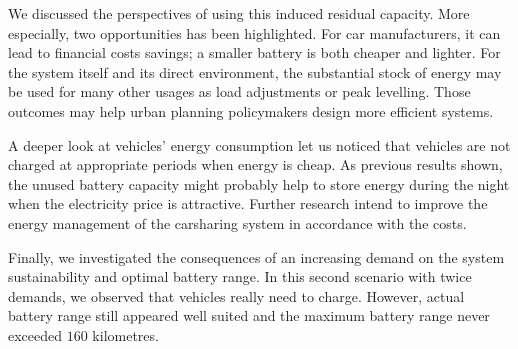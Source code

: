 \medskip
We discussed the perspectives of using this induced residual capacity.
More especially, two opportunities has been highlighted.
For car manufacturers, it can lead to financial costs savings; a smaller battery is both cheaper and lighter. %
For the system itself and its direct environment, the substantial stock of energy may be used for many other usages as load adjustments or peak levelling.
Those outcomes may help urban planning policymakers design more efficient systems.

\medskip
A deeper look at vehicles' energy consumption let us noticed that vehicles are not charged at appropriate periods when energy is cheap.
As previous results shown, the unused battery capacity might probably help to store energy during the night when the electricity price is attractive.
Further research intend to improve the energy management of the carsharing system in accordance with the costs.

\medskip
Finally, we investigated the consequences of an increasing demand on the system sustainability and optimal battery range.
In this second scenario with twice demands, we observed that vehicles really need to charge.
However, actual battery range still appeared well suited and the maximum battery range never exceeded $160$ kilometres.


